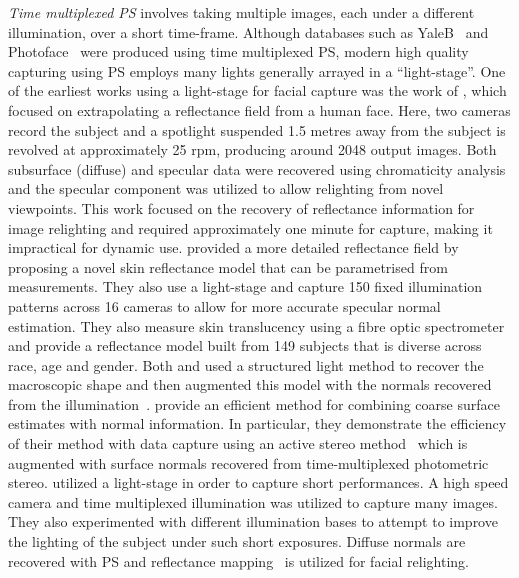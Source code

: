 \textit{Time multiplexed PS} involves taking multiple images, each under
a different illumination, over a short time-frame. Although databases such as
YaleB~\cite{georghiades2001fromfew} and Photoface~\cite{RefWorks:293} were produced
using time multiplexed PS, modern high quality capturing using PS employs
many lights generally arrayed in a ``light-stage''. One of the earliest works
using a light-stage for facial capture was the work of
\citet{debevec2000acquiring}, which focused on extrapolating a reflectance
field from a human face. Here, two cameras record the subject and a spotlight
suspended 1.5 metres away from the subject is revolved at approximately 25 rpm,
producing around 2048 output images. Both subsurface (diffuse) and specular data
were recovered using chromaticity analysis and the specular component was
utilized to allow relighting from novel viewpoints. This work focused on the
recovery of reflectance information for image relighting and required
approximately one minute for capture, making it impractical for dynamic use.
\citet{weyrich2006analysis} provided a more
detailed reflectance field by proposing a novel skin reflectance model
that can be parametrised from measurements. They also use a light-stage and
capture 150 fixed illumination patterns across 16 cameras to allow for more
accurate specular normal estimation. They also measure skin translucency
using a fibre optic spectrometer~\cite{nickell2000anisotropy} and provide
a reflectance model built from 149 subjects that is diverse across race, age and
gender. Both \citet{weyrich2006analysis} and \citet{debevec2000acquiring} used
a structured light method to recover
the macroscopic shape and then augmented this model with the normals
recovered from the illumination~\cite{nehab2005efficiently}.
\cite{nehab2005efficiently} provide an efficient method for combining coarse
surface estimates with normal information. In particular, they demonstrate the
efficiency of their method with data capture using an
active stereo method~\cite{zhang2003spacetime,davis2005spacetime} which is
augmented with surface normals recovered from time-multiplexed photometric
stereo.
\citet{wenger2005performance} utilized a light-stage in order to capture
short performances. A high speed camera and time multiplexed illumination was
utilized to capture many images. They also experimented with different
illumination bases to attempt to improve the lighting of the subject
under such short exposures. Diffuse normals are recovered with PS and
reflectance mapping~\cite{miller1984illumination} is utilized for facial
relighting.

